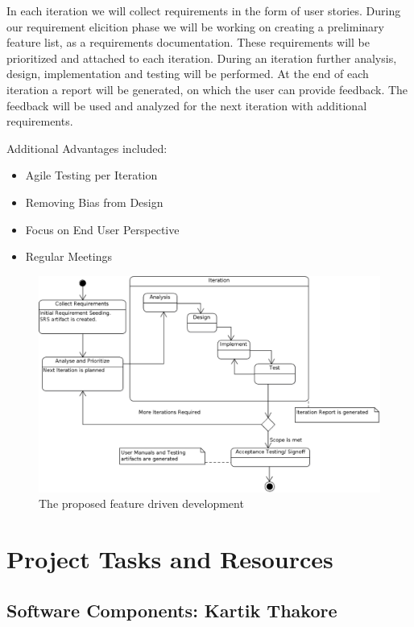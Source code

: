 \documentclass{journal}
\begin{document}
In each iteration we will collect requirements in the form of user stories. During our requirement elicition phase we will be working on creating a preliminary feature list, as a requirements documentation. These requirements will be 
prioritized and attached to each iteration. During an iteration further analysis, design, implementation and testing will be performed. At the end of each iteration a report will be generated, on which the user can provide feedback. The
feedback will be used and analyzed for the next iteration with additional requirements.

Additional Advantages included:
\begin{itemize}

\item{Agile Testing per Iteration}
\item{Removing Bias from Design}
\item{Focus on End User Perspective}
\item{Regular Meetings}

\end{itemize}

\begin{figure}[!h]
\begin{center}
\includegraphics[width=12cm]{images/Methodology} \caption{ The proposed feature driven development } \label{fig:methods}

\end{center}
\end{figure}

\section{Project Tasks and Resources}

\subsection{ Software Components: Kartik Thakore }
\end{document}
